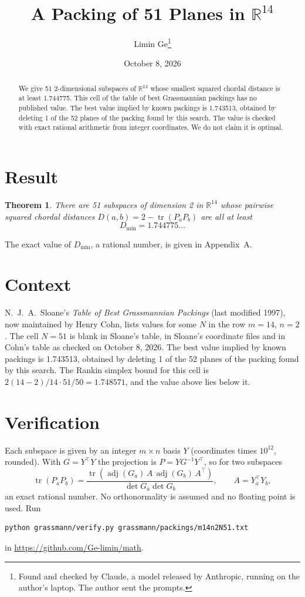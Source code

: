 \documentclass[11pt,a4paper]{article}
\title{A Packing of 51 Planes in $\mathbb{R}^{14}$}
\author{Limin Ge\thanks{Found and checked by Claude, a model released by Anthropic, running on the author's laptop. The author sent the prompts.}}
\date{October 8, 2026}
\newtheorem*{theorem}{Theorem}
\begin{document}
\maketitle
\begin{abstract}
We give 51 2-dimensional subspaces of $\mathbb{R}^{14}$ whose smallest squared chordal distance is at least 1.744775. This cell of the table of best Grassmannian packings has no published value. The best value implied by known packings is 1.743513, obtained by deleting 1 of the 52 planes of the packing found by this search. The value is checked with exact rational arithmetic from integer coordinates. We do not claim it is optimal.
\end{abstract}

\section{Result}
\begin{theorem}
There are 51 subspaces of dimension 2 in $\mathbb{R}^{14}$ whose pairwise squared chordal distances $D(a,b) = 2 - \operatorname{tr}(P_aP_b)$ are all at least
\[ D_{\min} = 1.744775\ldots \]
\end{theorem}
The exact value of $D_{\min}$, a rational number, is given in Appendix~A.


\section{Context}
N.~J.~A.~Sloane's \emph{Table of Best Grassmannian Packings} (last modified 1997), now maintained by Henry Cohn, lists values for some $N$ in the row $m=14$, $n=2$. The cell $N=51$ is blank in Sloane's table, in Sloane's coordinate files and in Cohn's table as checked on October 8, 2026. The best value implied by known packings is 1.743513, obtained by deleting 1 of the 52 planes of the packing found by this search. The Rankin simplex bound for this cell is $2(14-2)/14\cdot 51/50 = 1.748571$, and the value above lies below it.


\section{Verification}
Each subspace is given by an integer $m\times n$ basis $Y$ (coordinates times $10^{12}$, rounded). With $G=Y^\top Y$ the projection is $P=YG^{-1}Y^\top$, so for two subspaces
\[ \operatorname{tr}(P_aP_b)=\frac{\operatorname{tr}(\operatorname{adj}(G_a)\,A\,\operatorname{adj}(G_b)\,A^\top)}{\det G_a\det G_b},\qquad A=Y_a^\top Y_b, \]
an exact rational number. No orthonormality is assumed and no floating point is used. Run
\begin{verbatim}
python grassmann/verify.py grassmann/packings/m14n2N51.txt
\end{verbatim}
in \url{https://github.com/Ge-limin/math}.
\end{document}
